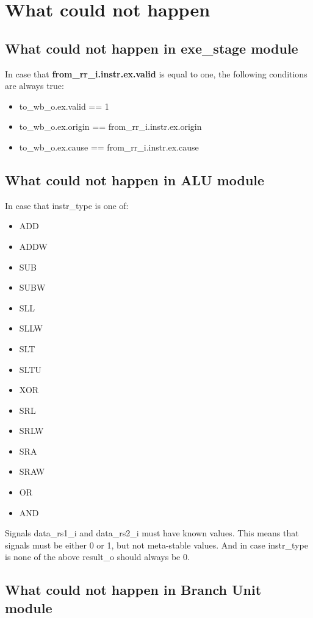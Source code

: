 \section{What could not happen}

\subsection{What could not happen in exe\_stage module}

In case that \textbf{from\_rr\_i.instr.ex.valid} is equal to one, the following conditions are always true:
\begin{itemize}
  \item to\_wb\_o.ex.valid == 1
  \item to\_wb\_o.ex.origin == from\_rr\_i.instr.ex.origin
  \item to\_wb\_o.ex.cause == from\_rr\_i.instr.ex.cause
\end{itemize}



\subsection{What could not happen in ALU module}

In case that instr\_type is one of:
\begin{itemize}
  \item ADD
  \item ADDW
  \item SUB
  \item SUBW
  \item SLL
  \item SLLW
  \item SLT
  \item SLTU
  \item XOR
  \item SRL
  \item SRLW
  \item SRA
  \item SRAW
  \item OR
  \item AND
\end{itemize}

Signals data\_rs1\_i and data\_rs2\_i must have known values. This means that signals must be either 0 or 1, but not meta-stable values.
And in case instr\_type is none of the above result\_o should always be 0.

\subsection{What could not happen in Branch Unit module}

